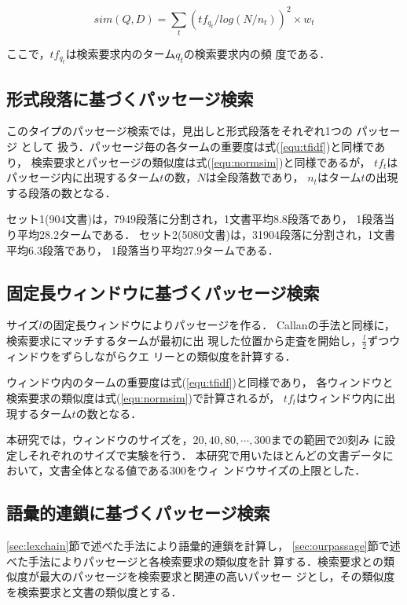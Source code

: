 \begin{equation}\label{equ:normsim}
sim(Q,D) = \sum_{t}(tf_{q_{t}}/log(N/n_{t}))^2 \times w_{t}
\end{equation}

\noindent ここで，$tf_{q_{t}}$は検索要求内のターム$q_{t}$の検索要求内の頻
度である．

\subsection{形式段落に基づくパッセージ検索}\label{subsec:formpara}
このタイプのパッセージ検索では，見出しと形式段落をそれぞれ1つの
パッセージ
として
扱う．パッセージ毎の各タームの重要度は式(\ref{equ:tfidf})と同様であり，
検索要求とパッセージの類似度は式(\ref{equ:normsim})と同様であるが，
$tf_{t}$はパッセージ内に出現するターム$t$の数，$N$は全段落数であり，
$n_{t}$はターム$t$の出現する段落の数となる．

セット1(904文書)は，7949段落に分割され，1文書平均8.8段落であり，
1段落当り平均28.2タームである．
セット2(5080文書)は，31904段落に分割され，1文書平均6.3段落であり，
1段落当り平均27.9タームである．

\subsection{固定長ウィンドウに基づくパッセージ検索}\label{subsec:window}

サイズ$l$の固定長ウィンドウによりパッセージを作る．
Callanの手法\cite{Callan:94}と同様に，検索要求にマッチするタームが最初に出
現した位置から走査を開始し，$\frac{l}{2}$ずつウィンドウをずらしながらクエ
リーとの類似度を計算する．

ウィンドウ内のタームの重要度は式(\ref{equ:tfidf})と同様であり，
各ウィンドウと検索要求の類似度は式(\ref{equ:normsim})で計算されるが，
$tf_{t}$はウィンドウ内に出現するターム$t$の数となる．

本研究では，ウィンドウのサイズを，$20,40,80,\cdots, 300$までの範囲で20刻み
に設定しそれぞれのサイズで実験を行う．
本研究で用いたほとんどの文書データにおいて，文書全体となる値である300をウィ
ンドウサイズの上限とした．

\subsection{語彙的連鎖に基づくパッセージ検索}\label{subsec:lexpas}
\ref{sec:lexchain}節で述べた手法により語彙的連鎖を計算し，
\ref{sec:ourpassage}節で述べた手法によりパッセージと各検索要求の類似度を計
算する．検索要求との類似度が最大のパッセージを検索要求と関連の高いパッセー
ジとし，その類似度を検索要求と文書の類似度とする．

